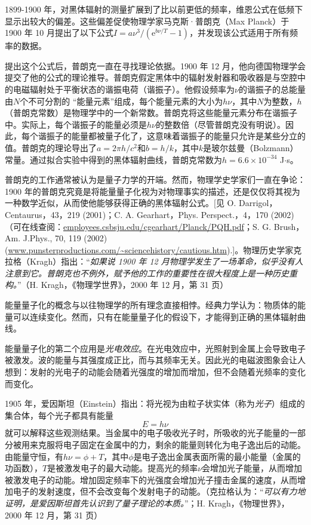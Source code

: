 	1899-1900 年，对黑体辐射的测量扩展到了比以前更低的频率，维恩公式在低频下显示出较大的偏差。这些偏差促使物理学家马克斯·普朗克（Max Planck）于 1900 年 10 月提出了以下公式$I=a \nu^3 / \left(\text{e}^{b\nu / T}-1\right)$，并发现该公式适用于所有频率的数据。

	提出这个公式后，普朗克一直在寻找理论依据。1900 年 12 月，他向德国物理学会提交了他的公式的理论推导。普朗克假定黑体中的辐射发射器和吸收器是与空腔中的电磁辐射处于平衡状态的谐振电荷（谐振子）。他假设频率为$\nu$的谐振子的总能量由$N$个不可分割的 “能量元素”组成，每个能量元素的大小为$h\nu$，其中$N$为整数，$h$（普朗克常数）是物理学中的一个新常数。普朗克将这些能量元素分布在谐振子中。实际上，每个谐振子的能量必须是$h\nu$的整数倍（尽管普朗克没有明说）。因此，每个谐振子的能量都被量子化了，这意味着谐振子的能量只允许是某些分立的值。普朗克的理论导出了$a=2 \pi  h/c^2$和$b=h/k$，其中$k$是玻尔兹曼（Bolzmann）常量。通过拟合实验中得到的黑体辐射曲线，普朗克常数为$h=6.6 \times 10^{-34}$ J$\cdot$s。

	普朗克的工作通常被认为是量子力学的开端。然而，物理学史学家们一直在争论：1900 年的普朗克究竟是将能量量子化视为对物理事实的描述，还是仅仅将其视为一种数学近似，从而使他能够获得正确的黑体辐射公式。[见 O. Darrigol，Centaurus，43，219 (2001)；C. A. Gearhart，Phys. Perspect.，4，170 (2002)（可在线查阅：\url{employees.csbsju.edu/cgearhart/Planck/PQH.pdf}；S. G. Brush，Am. J.Phys., 70, 119 (2002) (\url{www.punsterproductions.com/~sciencehistory/cautious.htm}).]。物理历史学家克拉格（Kragh）指出：“\textit{如果说 1900 年 12 月物理学发生了一场革命，似乎没有人注意到它。普朗克也不例外，赋予他的工作的重要性在很大程度上是一种历史重构。}”（H. Kragh，《物理学世界》，2000 年 12 月，第 31 页）

	能量量子化的概念与以往物理学的所有理念直接相悖。经典力学认为：物质体的能量可以连续变化。然而，只有在能量量子化的假设下，才能得到正确的黑体辐射曲线。

	能量量子化的第二个应用是\textit{光电效应}。在光电效应中，光照射到金属上会导致电子被激发。波的能量与其强度成正比，而与其频率无关。因此光的电磁波图象会让人想到：发射的光电子的动能会随着光强度的增加而增加，但不会随着光频率的变化而变化。

	1905 年，爱因斯坦（Einstein）指出：将光视为由粒子状实体（称为\textit{光子}）组成的集合体，每个光子都具有能量
	\begin{equation}
		\boxed{E=h\nu}
		\label{eq:1.3 photoelectric effect equation}
	\end{equation}
	就可以解释这些观测结果。当金属中的电子吸收光子时，所吸收的光子能量的一部分被用来克服将电子固定在金属中的力，剩余的能量则转化为电子逸出后的动能。由能量守恒，有$h\nu = \phi+ T$，其中$\phi$是电子逸出金属表面所需的最小能量（金属的功函数），$T$是被激发电子的最大动能。提高光的频率$\nu$会增加光子能量，从而增加被激发电子的动能。增加固定频率下的光强度会增加光子撞击金属的速度，从而增加电子的发射速度，但不会改变每个发射电子的动能。（克拉格认为：“\textit{可以有力地证明，是爱因斯坦首先认识到了量子理论的本质。}”；H. Kragh，《物理世界》，2000 年 12 月，第 31 页）

